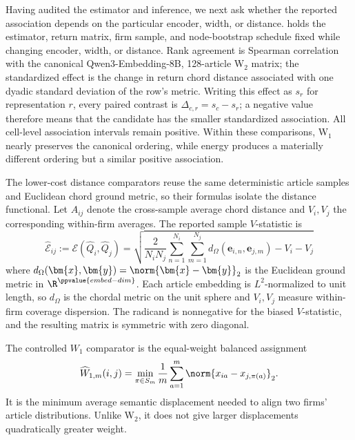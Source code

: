 Having audited the estimator and inference, we next ask whether the reported
association depends on the particular encoder, width, or distance.
 holds the estimator, return matrix,
firm sample, and node-bootstrap schedule fixed while changing encoder, width,
or distance.
Rank agreement is Spearman correlation with the canonical Qwen3-Embedding-8B,
128-article W$_2$ matrix; the standardized effect is the change in return
chord distance associated with one dyadic standard deviation of the
row's metric.
Writing this effect as $s_r$ for representation $r$, every paired contrast is
$\Delta_{c,r}=s_c-s_r$; a negative value therefore means that the candidate
has the smaller standardized association.
All cell-level association intervals remain positive.
Within these comparisons, W$_1$ nearly preserves the canonical ordering,
while energy produces a materially different ordering but a similar positive
association.

The lower-cost distance comparators reuse the same deterministic article
samples and Euclidean chord ground metric, so their formulas isolate the
distance functional.
Let $A_{ij}$ denote the cross-sample average chord distance and $V_i,V_j$ the
corresponding within-firm averages.
The reported sample $V$-statistic is
\begin{equation}\label{eq:sample-energy-distance}
  \widehat{\mathcal E}_{ij}
  :=\mathcal E(\widehat Q_i,\widehat Q_j) = \sqrt{
    \frac{2}{N_i N_j} \sum_{n=1}^{N_i} \sum_{m=1}^{N_j}
    d_\Omega(\bm{e}_{i,n}, \bm{e}_{j,m}) - V_i - V_j
  }
\end{equation}
where $d_\Omega(\bm{x}, \bm{y}) = \norm{\bm{x} - \bm{y}}_2$ is the Euclidean
ground metric in $\R^{\ppvalue{embed-dim}}$. Each article embedding is
$L^2$-normalized to unit length, so $d_\Omega$ is the chordal metric on the
unit sphere and $V_i,V_j$ measure within-firm coverage dispersion. The
radicand is nonnegative for the biased $V$-statistic, and the resulting matrix
is symmetric with zero diagonal.

The controlled $W_1$ comparator is the equal-weight balanced assignment
\begin{equation}\label{eq:empirical-wasserstein}
  \widehat W_{1,m}(i,j)
  = \min_{\pi\in S_m}\frac{1}{m}\sum_{a=1}^{m}
  \norm{x_{ia}-x_{j,\pi(a)}}_2.
\end{equation}
It is the minimum average semantic displacement needed to align two firms'
article distributions. Unlike W$_2$, it does not give larger displacements
quadratically greater weight.

